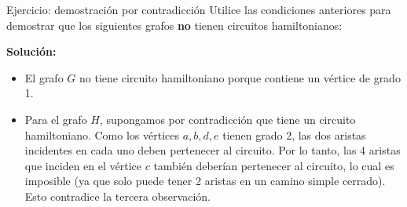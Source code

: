 \begin{exampleblock}{Ejercicio: demostración por contradicción}
Utilice las condiciones anteriores para demostrar que los siguientes grafos \textbf{no} tienen circuitos hamiltonianos:

\begin{center}
\end{center}

\end{exampleblock}

\textbf{Solución:}

\begin{itemize}
  \item El grafo \( G \) no tiene circuito hamiltoniano porque contiene un vértice de grado 1.
  \item Para el grafo \( H \), supongamos por contradicción que tiene un circuito hamiltoniano. Como los vértices \( a, b, d, e \) tienen grado 2, las dos aristas incidentes en cada uno deben pertenecer al circuito. Por lo tanto, las 4 aristas que inciden en el vértice \( c \) también deberían pertenecer al circuito, lo cual es imposible (ya que solo puede tener 2 aristas en un camino simple cerrado). Esto contradice la tercera observación.
\end{itemize}


